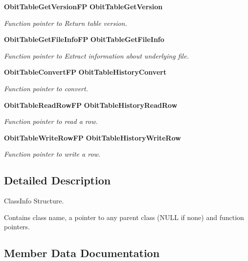 \begin{CompactItemize}
{\bf Obit\-Table\-Get\-Version\-FP} {\bf Obit\-Table\-Get\-Version}
\begin{CompactList}\small\item\em Function pointer to Return table version. \item\end{CompactList}\item 
{\bf Obit\-Table\-Get\-File\-Info\-FP} {\bf Obit\-Table\-Get\-File\-Info}
\begin{CompactList}\small\item\em Function pointer to Extract information about underlying file. \item\end{CompactList}\item 
{\bf Obit\-Table\-Convert\-FP} {\bf Obit\-Table\-History\-Convert}
\begin{CompactList}\small\item\em Function pointer to convert. \item\end{CompactList}\item 
{\bf Obit\-Table\-Read\-Row\-FP} {\bf Obit\-Table\-History\-Read\-Row}
\begin{CompactList}\small\item\em Function pointer to read a row. \item\end{CompactList}\item 
{\bf Obit\-Table\-Write\-Row\-FP} {\bf Obit\-Table\-History\-Write\-Row}
\begin{CompactList}\small\item\em Function pointer to write a row. \item\end{CompactList}\end{CompactItemize}


\subsection{Detailed Description}
Class\-Info Structure. 

Contains class name, a pointer to any parent class (NULL if none) and function pointers. 



\subsection{Member Data Documentation}
